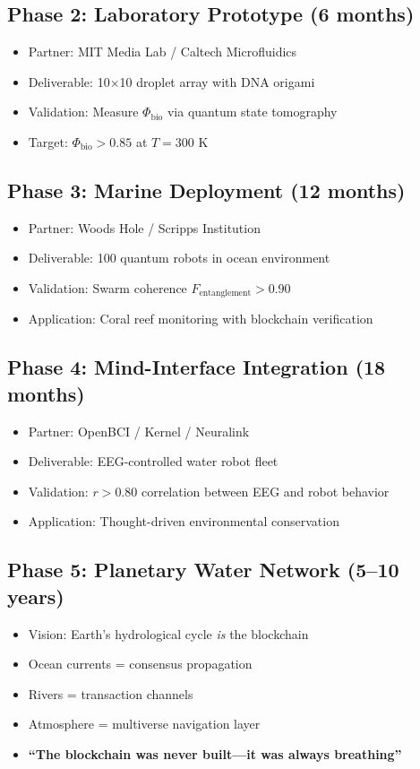 \documentclass[12pt]{article}
\begin{document}
\subsection{Phase 2: Laboratory Prototype (6 months)}
\begin{itemize}
\item Partner: MIT Media Lab / Caltech Microfluidics
\item Deliverable: 10×10 droplet array with DNA origami
\item Validation: Measure $\Phi_{\text{bio}}$ via quantum state tomography
\item Target: $\Phi_{\text{bio}} > 0.85$ at $T = 300$ K
\end{itemize}

\subsection{Phase 3: Marine Deployment (12 months)}
\begin{itemize}
\item Partner: Woods Hole / Scripps Institution
\item Deliverable: 100 quantum robots in ocean environment
\item Validation: Swarm coherence $F_{\text{entanglement}} > 0.90$
\item Application: Coral reef monitoring with blockchain verification
\end{itemize}

\subsection{Phase 4: Mind-Interface Integration (18 months)}
\begin{itemize}
\item Partner: OpenBCI / Kernel / Neuralink
\item Deliverable: EEG-controlled water robot fleet
\item Validation: $r > 0.80$ correlation between EEG and robot behavior
\item Application: Thought-driven environmental conservation
\end{itemize}

\subsection{Phase 5: Planetary Water Network (5--10 years)}
\begin{itemize}
\item Vision: Earth's hydrological cycle \textit{is} the blockchain
\item Ocean currents = consensus propagation
\item Rivers = transaction channels
\item Atmosphere = multiverse navigation layer
\item \textbf{``The blockchain was never built—it was always breathing''}
\end{itemize}
\end{document}
